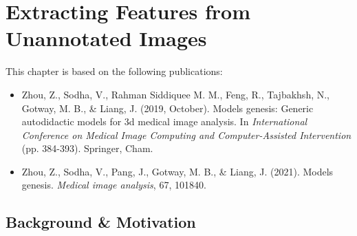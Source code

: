 \chapter{Extracting Features from Unannotated Images}
\label{ch5}

This chapter is based on the following publications:
\begin{itemize}
    \item Zhou, Z., Sodha, V., Rahman Siddiquee M. M., Feng, R., Tajbakhsh, N., Gotway, M. B., \& Liang, J. (2019, October). Models genesis: Generic autodidactic models for 3d medical image analysis. In \textit{International Conference on Medical Image Computing and Computer-Assisted Intervention} (pp. 384-393). Springer, Cham.
    \item Zhou, Z., Sodha, V., Pang, J., Gotway, M. B., \& Liang, J. (2021). Models genesis. \textit{Medical image analysis}, 67, 101840.
\end{itemize}



\newpage

\section{Background \& Motivation}

